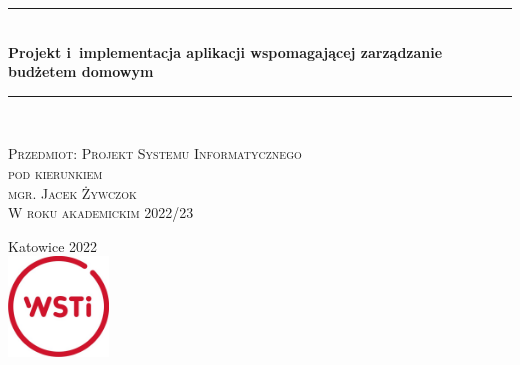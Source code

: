 \documentclass[a4paper,10pt, twoside]{report}
\newcommand{\customstyletitle}[1]{\Huge{\textbf{#1}}}
\newcommand{\HRule}{\rule{\linewidth}{0.5mm}} %
\begin{document}
\begin{large}
\begin{titlepage}
	\begin{center}
    \HRule\\[0.4cm]
	{\customstyletitle{Projekt i implementacja aplikacji wspomagającej zarządzanie budżetem domowym}}\\[0.4cm] 
    \HRule\\[1.5cm]
    \end{center}
	
	\begin{flushright}
        \textsc{Przedmiot: Projekt Systemu Informatycznego}\\[0cm]
        \textsc{pod kierunkiem}\\[0cm]
        \textsc{mgr. Jacek Żywczok}\\[0cm]
        \textsc{W roku akademickim 2022/23}\\[0cm]
    \end{flushright}
 
	\vfill                  %
	\begin{center}
    {Katowice 2022}\\	    %
	\includegraphics[width=0.2\textwidth]{figures/WSTI-logo.jpg}\\[1cm]
	\end{center}
\end{titlepage}

\null\newpage %

\renewcommand*\contentsname{Spis treści}
\tableofcontents                    %




\end{large}
\end{document}
